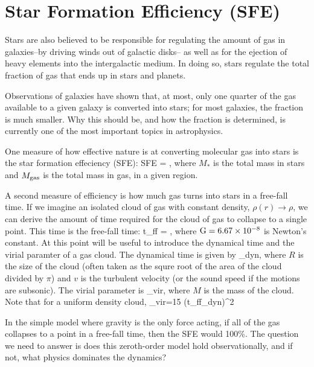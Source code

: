 \documentclass[../dissertation.tex]{subfiles}
\begin{document}
\section{Star Formation Efficiency (SFE)}

 Stars are also believed to be responsible for regulating the amount of gas in galaxies--by driving winds out of galactic disks-- as well as for the ejection of heavy elements into the intergalactic
medium.  In doing so, stars regulate the total fraction of gas that ends up in stars and planets. 
 
Observations of galaxies have shown that, at most, only one quarter of the gas available to a given galaxy is converted into stars; for most galaxies, the fraction is much smaller. 
Why this should be, and how the fraction is determined, is currently one of the most important topics in astrophysics.

One measure of how effective nature is at converting molecular gas into stars is the star formation effeciency (SFE):
%
\be
{\rm SFE} = ,
\ee
%
where $M_*$ is the total mass in stars and $M_{\rm gas}$ is the total mass in gas, in a given region.

A second measure of efficiency is how much gas turns into stars in a free-fall time. If we imagine an isolated cloud of gas with constant density, $\rho(r) \rightarrow \rho$, we can derive the amount of time required for the cloud of gas to collapse to a single point.
This time is the free-fall time:
%
\be
t_{\rm ff} = ,
\ee
%
where $ {\rm G} = 6.67 \times 10^{-8} $ is Newton's constant. At this point will be useful to introduce the dynamical time and the virial paramter of a gas cloud. The dynamical time is given by
%
\be
\tau_{\rm dyn},
\ee
%
where $R$ is the size of the cloud (often taken as the squre root of the area of the cloud divided by $\pi$) and $v$ is the turbulent velocity (or the sound speed if the motions are subsonic). The virial parameter is
%
\be
\alpha_{\rm vir},
\ee
%
where $M$ is the mass of the cloud. Note that for a uniform density cloud,
%
\be
\alpha_{\rm vir}={15\pi} \left({t_{\rm ff}\over \tau_{\rm dyn}}\right)^2
\ee
%

In the simple model where gravity is the only force acting, if all of the gas collapses to a point in a free-fall time, then the SFE would 100\%.
The question we need to answer is does this zeroth-order model hold observationally, and if not, what physics dominates the dynamics?
\end{document}

